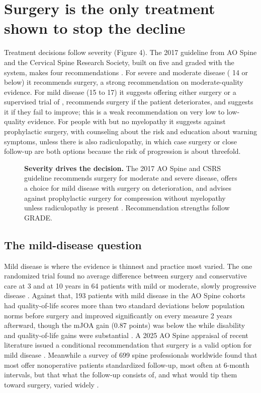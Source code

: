 \documentclass[11pt, letterpaper]{article}
\begin{document}
\section{Surgery is the only treatment shown to stop the decline}

Treatment decisions follow severity (Figure 4). The 2017 guideline from AO Spine and the Cervical Spine Research Society, built on five  and graded with the  system, makes four recommendations \citep{fehlings2017cpg}. For severe and moderate disease ( 14 or below) it recommends surgery, a strong recommendation on moderate-quality evidence. For mild disease (15 to 17) it suggests offering either surgery or a supervised trial of , recommends surgery if the patient deteriorates, and suggests it if they fail to improve; this is a weak recommendation on very low to low-quality evidence. For people with  but no myelopathy it suggests against prophylactic surgery, with counseling about the risk and education about warning symptoms, unless there is also \gls{radiculopathy}, in which case surgery or close follow-up are both options because the risk of progression is about threefold.

\begin{figure}[!htb]
\centering

\caption{\textbf{Severity drives the decision.} The 2017 AO Spine and CSRS guideline recommends surgery for moderate and severe disease, offers a choice for mild disease with surgery on deterioration, and advises against prophylactic surgery for compression without myelopathy unless radiculopathy is present \citep{fehlings2017cpg}. Recommendation strengths follow GRADE.}
\end{figure}

\subsection*{The mild-disease question}

Mild disease is where the evidence is thinnest and practice most varied. The one randomized trial found no average difference between surgery and conservative care at 3 and at 10 years in 64 patients with mild or moderate, slowly progressive disease \citep{kadanka2011}. Against that, 193 patients with mild disease in the AO Spine cohorts had quality-of-life scores more than two standard deviations below population norms before surgery and improved significantly on every measure 2 years afterward, though the mJOA gain (0.87 points) was below the  while disability and quality-of-life gains were substantial \citep{badhiwala2019}. A 2025 AO Spine appraisal of recent literature issued a conditional recommendation that surgery is a valid option for mild disease \citep{fehlings2025}. Meanwhile a survey of 699 spine professionals worldwide found that most offer nonoperative patients standardized follow-up, most often at 6-month intervals, but that what the follow-up consists of, and what would tip them toward surgery, varied widely \citep{brannigan2024}.
\end{document}
